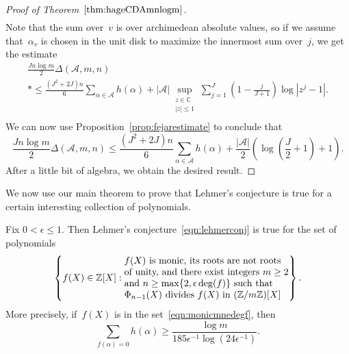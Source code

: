 \begin{proof}[Proof of Theorem~$\ref{thm:hageCDAmnlogm}$]
\begin{multline*}
\end{multline*}
Note that the sum over~$v$ is over archimedean absolute values, so if
we assume that~${\alpha}_v$ is chosen in the unit disk to maximize the
innermost sum over~$j$, we get the estimate
\begin{multline*}
  \frac{Jn\log m}{2}{\Delta}({{\mathcal A}},m,n)  \\*
  \le \frac{(J^2+2J)n}{6}\sum_{{\alpha}\in{{\mathcal A}}}h({\alpha}) 
    +  |{{\mathcal A}}| \sup_{\substack{z\in{\mathbb{C}}\\|z|\le1\\}}
         \sum_{j=1}^J \left(1-\frac{j}{J+1}\right)\log|z^j-1|.
\end{multline*}
We can now use Proposition~\ref{prop:fejarestimate} to conclude
that
\[
  \frac{Jn\log m}{2}{\Delta}({{\mathcal A}},m,n) 
  \le \frac{(J^2+2J)n}{6}\sum_{{\alpha}\in{{\mathcal A}}}h({\alpha}) 
    + \frac{|{{\mathcal A}}|}{2}\left(\log\left(\frac{J}{2}+1\right)+1\right).
\]
After a little bit of algebra, we obtain the  desired result.
\end{proof}

We now use our main theorem to prove that Lehmer's conjecture
is true for a certain interesting collection of polynomials.

\begin{corollary}
\label{cor:htgeelogm}
Fix $0<{\epsilon}\le 1$. Then Lehmer's conjecture~\eqref{eqn:lehmerconj} is
true for the set of polynomials
\begin{equation} 
  \label{eqn:monicmnedegf}
  \left\{ f(X)\in {\mathbb{Z}}[X] :
    \begin{tabular}{@{}l@{}}
       $f(X)$ is monic, its roots are not roots\\ 
       of unity, and there exist integers $m\ge2$ \\
       and $n\ge\max\{2,{\epsilon}\deg(f)\}$ such that\\
       ${\Phi}_{n-1}(X)$ divides $f(X)$ in $({\mathbb{Z}}/m{\mathbb{Z}})[X]$\\
    \end{tabular}
  \right\}.
\end{equation}
More precisely, if~$f(X)$ is in the set~\eqref{eqn:monicmnedegf}, then
\begin{equation}
  \label{eqn:logm185e}
  \sum_{f({\alpha})=0} h({\alpha}) \ge 
   \frac{\log m}{185{\epsilon}^{-1}\log(24{\epsilon}^{-1})}.
\end{equation}
\end{corollary}

